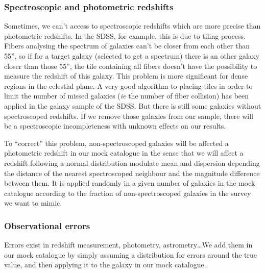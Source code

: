 \subsubsection{Spectroscopic and photometric redshifts}
%
Sometimes, we can't access to spectroscopic redshifts which are more precise
than photometric redshifts. In the SDSS, for example, this is due to tiling
process. Fibers analysing the spectrum of galaxies can't be closer from each
other than 55'', so if for a target galaxy (selected to get a spectrum)
there is an other galaxy closer than those 55'', the tile containing all fibers
doesn't have the possibility to measure the redshift of this galaxy. This
problem is more significant for dense regions in the celestial plane. A very
good algorithm to placing tiles in order to limit the number of missed galaxies
(\textit{ie} the number of fiber collision) has been applied in the galaxy
sample of the SDSS\@. But there is still some galaxies without spectroscoped
redshifts. If we remove those galaxies from our sample, there will be a
spectroscopic incompleteness with unknown effects on our results.

To ``correct'' this problem, non-spectroscoped galaxies will be affected a
photometric redshift in our mock catalogue in the sense that we will affect a
redshift following a normal distribution modulate mean and dispersion depending
the distance of the nearest spectroscoped neighbour and the magnitude
difference between them. It is applied randomly in a given number of galaxies
in the mock catalogue according to the fraction of non-spectroscoped galaxies
in the survey we want to mimic.
%
\subsubsection{Observational errors}
%
Errors exist in redshift measurement, photometry, astrometry\ldots We add
them in our mock catalogue by simply assuming a distribution for errors around
the true value, and then applying it to the galaxy in our mock
catalogue..
